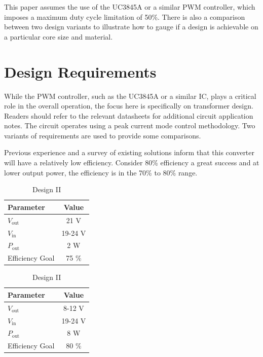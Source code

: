 \documentclass{article}
\begin{document}
This paper assumes the use of the UC3845A or a similar PWM controller, which imposes a maximum duty cycle limitation of 50\%. There is also a comparison between two design variants to illustrate how to gauge if a design is achievable on a particular core size and material.

\section{Design Requirements}
While the PWM controller, such as the UC3845A or a similar IC, plays a critical role in the overall operation, the focus here is specifically on transformer design. Readers should refer to the relevant datasheets for additional circuit application notes. The circuit operates using a peak current mode control methodology.
Two variants of requirements are used to provide some comparisons.

Previous experience and a survey of existing solutions inform 
that this converter will have a relatively low efficiency.
Consider 80\% efficiency a great success and at lower output power, the efficiency 
is in the 70\% to 80\% range.

\begin{table}[h]
    \centering
    \begin{minipage}{0.45\textwidth}
        \centering
        \begin{tabular}{@{} l c @{}}
            \toprule
            Parameter & Value \\
            \midrule
            \( V_{\text{out}} \) & 21 V \\
            \( V_{\text{in}} \) & 19-24 V \\
            \( P_{\text{out}} \) & 2 W \\
            Efficiency Goal & 75 \% \\
            \bottomrule
        \end{tabular}
        \caption{Design I}
        \label{tab:specs1}
    \end{minipage}%
    \hspace{0.05\textwidth} %
    \begin{minipage}{0.45\textwidth}
        \centering
        \begin{tabular}{@{} l c @{}}
            \toprule
            Parameter & Value \\
            \midrule
            \( V_{\text{out}} \) & 8-12 V \\
            \( V_{\text{in}} \) & 19-24 V \\
            \( P_{\text{out}} \) & 8 W \\
            Efficiency Goal & 80 \% \\
            \bottomrule
        \end{tabular}
        \caption{Design II}
        \label{tab:specs2}
    \end{minipage}
\end{table}
\end{document}

